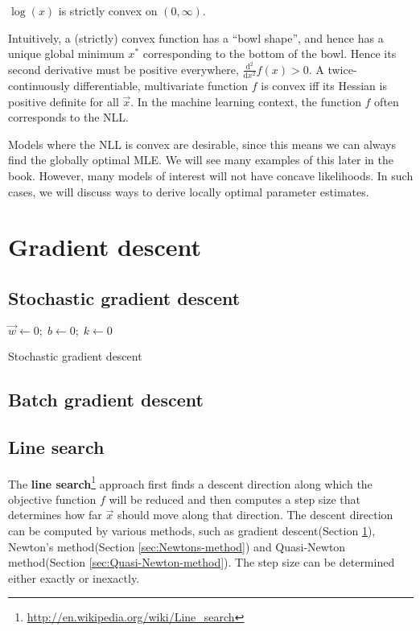 \begin{proposition}
$\log(x)$ is strictly convex on $(0, \infty)$.
\end{proposition}

Intuitively, a (strictly) convex function has a “bowl shape”, and hence has a unique global minimum $x^*$ corresponding to the bottom of the bowl. Hence its second derivative must be positive everywhere, $\frac{\mathrm{d}^2}{\mathrm{d}x^2}f(x)>0$. A twice-continuously differentiable, multivariate function $f$ is convex iff its Hessian is positive definite for all $\vec{x}$. In the machine learning context, the function $f$ often corresponds to the NLL.

Models where the NLL is convex are desirable, since this means we can always find the globally optimal MLE. We will see many examples of this later in the book. However, many models of interest will not have concave likelihoods. In such cases, we will discuss ways to derive locally optimal parameter estimates.


\section{Gradient descent}
\label{sec:Gradient-descent}


\subsection{Stochastic gradient descent}

\begin{algorithm}[htbp]
	
    $\vec{w} \leftarrow 0;\; b \leftarrow 0;\; k \leftarrow 0$\;
\caption{Stochastic gradient descent}
\end{algorithm}


\subsection{Batch gradient descent}


\subsection{Line search}
The \textbf{line search}\footnote{\url{http://en.wikipedia.org/wiki/Line_search}} approach first finds a descent direction along which the objective function $f$ will be reduced and then computes a step size that determines how far $\vec{x}$ should move along that direction. The descent direction can be computed by various methods, such as gradient descent(Section \ref{sec:Gradient-descent}), Newton's method(Section \ref{sec:Newtons-method}) and Quasi-Newton method(Section \ref{sec:Quasi-Newton-method}). The step size can be determined either exactly or inexactly.


